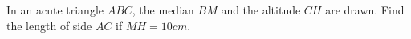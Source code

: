In an acute triangle $ABC$, the median $BM$ and the altitude $CH$ are drawn. Find the length of side $AC$ if $MH=10cm$.
